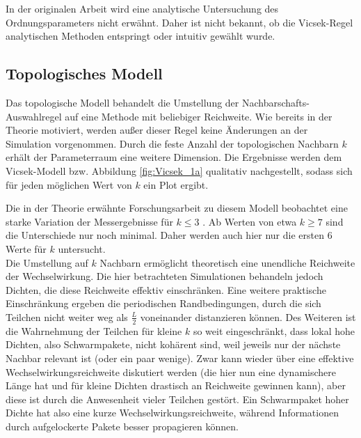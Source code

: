 \documentclass{solutionclass}
\begin{document}
In der originalen Arbeit wird eine analytische Untersuchung des Ordnungsparameters nicht erwähnt. Daher ist nicht bekannt, ob die Vicsek-Regel analytischen Methoden entspringt oder intuitiv gewählt wurde.

\subsection*{Topologisches Modell}
Das topologische Modell behandelt die Umstellung der Nachbarschafts-Auswahlregel auf eine Methode mit beliebiger Reichweite. Wie bereits in der Theorie motiviert, werden außer dieser Regel keine Änderungen an der Simulation vorgenommen. Durch die feste Anzahl der topologischen Nachbarn $k$ erhält der Parameterraum eine weitere Dimension. Die Ergebnisse werden dem Vicsek-Modell bzw. Abbildung \ref{fig:Vicsek_1a} qualitativ nachgestellt, sodass sich für jeden möglichen Wert von $k$ ein Plot ergibt.

Die in der Theorie erwähnte Forschungsarbeit zu diesem Modell beobachtet eine starke Variation der Messergebnisse für $k \leq 3$ \cite{PhaseTransitions2013}. Ab Werten von etwa $k \geq 7$ sind die Unterschiede nur noch minimal. Daher werden auch hier nur die ersten $\num{6}$ Werte für $k$ untersucht.\\

Die Umstellung auf $k$ Nachbarn ermöglicht theoretisch eine unendliche Reichweite der Wechselwirkung. Die hier betrachteten Simulationen behandeln jedoch Dichten, die diese Reichweite effektiv einschränken. Eine weitere praktische Einschränkung ergeben die periodischen Randbedingungen, durch die sich Teilchen nicht weiter weg als $\tfrac{L}{2}$ voneinander distanzieren können. Des Weiteren ist die Wahrnehmung der Teilchen für kleine $k$ so weit eingeschränkt, dass lokal hohe Dichten, also Schwarmpakete, nicht kohärent sind, weil jeweils nur der nächste Nachbar relevant ist (oder ein paar wenige). Zwar kann wieder über eine effektive Wechselwirkungsreichweite diskutiert werden (die hier nun eine dynamischere Länge hat und für kleine Dichten drastisch an Reichweite gewinnen kann), aber diese ist durch die Anwesenheit vieler Teilchen gestört. Ein Schwarmpaket hoher Dichte hat also eine kurze Wechselwirkungsreichweite, während Informationen durch aufgelockerte Pakete besser propagieren können.\\
\end{document}
